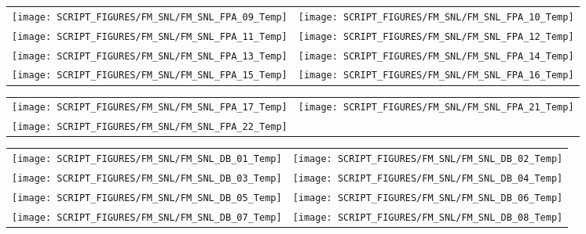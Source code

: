 \begin{figure}[p]
\begin{tabular*}{\textwidth}{l@{\extracolsep{\fill}}r}
\texttt{[image: SCRIPT\_FIGURES/FM\_SNL/FM\_SNL\_FPA\_09\_Temp]} &
\texttt{[image: SCRIPT\_FIGURES/FM\_SNL/FM\_SNL\_FPA\_10\_Temp]} \\
\texttt{[image: SCRIPT\_FIGURES/FM\_SNL/FM\_SNL\_FPA\_11\_Temp]} &
\texttt{[image: SCRIPT\_FIGURES/FM\_SNL/FM\_SNL\_FPA\_12\_Temp]} \\
\texttt{[image: SCRIPT\_FIGURES/FM\_SNL/FM\_SNL\_FPA\_13\_Temp]} &
\texttt{[image: SCRIPT\_FIGURES/FM\_SNL/FM\_SNL\_FPA\_14\_Temp]} \\
\texttt{[image: SCRIPT\_FIGURES/FM\_SNL/FM\_SNL\_FPA\_15\_Temp]} &
\texttt{[image: SCRIPT\_FIGURES/FM\_SNL/FM\_SNL\_FPA\_16\_Temp]}
\end{tabular*}
\end{figure}

\begin{figure}[p]
\begin{tabular*}{\textwidth}{l@{\extracolsep{\fill}}r}
\texttt{[image: SCRIPT\_FIGURES/FM\_SNL/FM\_SNL\_FPA\_17\_Temp]} &
\texttt{[image: SCRIPT\_FIGURES/FM\_SNL/FM\_SNL\_FPA\_21\_Temp]} \\
\texttt{[image: SCRIPT\_FIGURES/FM\_SNL/FM\_SNL\_FPA\_22\_Temp]}
\end{tabular*}
\end{figure}

\begin{figure}[p]
\begin{tabular*}{\textwidth}{l@{\extracolsep{\fill}}r}
\texttt{[image: SCRIPT\_FIGURES/FM\_SNL/FM\_SNL\_DB\_01\_Temp]} &
\texttt{[image: SCRIPT\_FIGURES/FM\_SNL/FM\_SNL\_DB\_02\_Temp]} \\
\texttt{[image: SCRIPT\_FIGURES/FM\_SNL/FM\_SNL\_DB\_03\_Temp]} &
\texttt{[image: SCRIPT\_FIGURES/FM\_SNL/FM\_SNL\_DB\_04\_Temp]} \\
\texttt{[image: SCRIPT\_FIGURES/FM\_SNL/FM\_SNL\_DB\_05\_Temp]} &
\texttt{[image: SCRIPT\_FIGURES/FM\_SNL/FM\_SNL\_DB\_06\_Temp]} \\
\texttt{[image: SCRIPT\_FIGURES/FM\_SNL/FM\_SNL\_DB\_07\_Temp]} &
\texttt{[image: SCRIPT\_FIGURES/FM\_SNL/FM\_SNL\_DB\_08\_Temp]}
\end{tabular*}
\end{figure}

